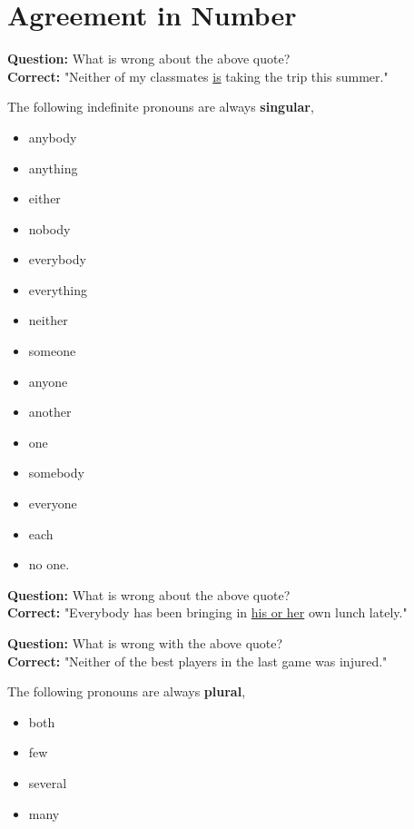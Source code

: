 \documentclass[12pt]{article} %
\begin{document}
\section{Agreement in Number}


\textbf{Question: }What is wrong about the above quote?\\
\textbf{Correct: }"Neither of my classmates \underline{is} taking the trip this summer."

The following indefinite pronouns are always \textbf{singular},

\begin{multicols}{4}
  \begin{itemize}
    \item anybody
    \item anything
    \item either
    \item nobody
      \columnbreak
    \item everybody
    \item everything
    \item neither
    \item someone
      \columnbreak
    \item anyone
    \item another
    \item one
    \item somebody
      \columnbreak
    \item everyone
    \item each
    \item no one.
    \end{itemize}
\end{multicols}


\textbf{Question: }What is wrong about the above quote?\\
\textbf{Correct: }"Everybody has been bringing in \underline{his or her} own lunch lately."




\textbf{Question:} What is wrong with the above quote?\\
\textbf{Correct: }"Neither of the best players in the last game was injured."


The following pronouns are always \textbf{plural},
\begin{multicols}{4}
  \begin{itemize}
    \item both
      \columnbreak
    \item few
      \columnbreak
    \item several
      \columnbreak
    \item many
  \end{itemize}
\end{multicols}
\end{document}

